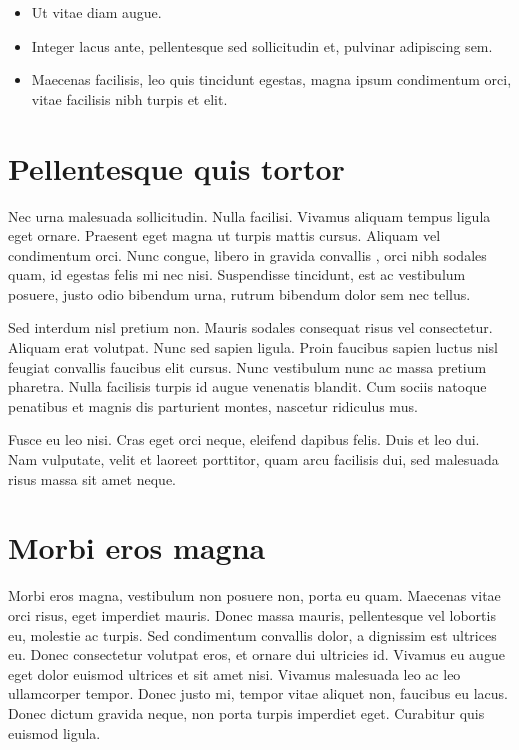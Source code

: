 \documentclass[a4paper,USenglish,english]{lipics-v2018}
\begin{document}
\begin{itemize}
\item Ut vitae diam augue. 
\item Integer lacus ante, pellentesque sed sollicitudin et, pulvinar adipiscing sem. 
\item Maecenas facilisis, leo quis tincidunt egestas, magna ipsum condimentum orci, vitae facilisis nibh turpis et elit. 
\end{itemize}

\section{Pellentesque quis tortor}

Nec urna malesuada sollicitudin. Nulla facilisi. Vivamus aliquam tempus ligula eget ornare. Praesent eget magna ut turpis mattis cursus. Aliquam vel condimentum orci. Nunc congue, libero in gravida convallis \cite{DBLP:conf/focs/HopcroftPV75}, orci nibh sodales quam, id egestas felis mi nec nisi. Suspendisse tincidunt, est ac vestibulum posuere, justo odio bibendum urna, rutrum bibendum dolor sem nec tellus. 

\begin{lemma} 
Sed interdum nisl pretium non. Mauris sodales consequat risus vel consectetur. Aliquam erat volutpat. Nunc sed sapien ligula. Proin faucibus sapien luctus nisl feugiat convallis faucibus elit cursus. Nunc vestibulum nunc ac massa pretium pharetra. Nulla facilisis turpis id augue venenatis blandit. Cum sociis natoque penatibus et magnis dis parturient montes, nascetur ridiculus mus.
\end{lemma}

Fusce eu leo nisi. Cras eget orci neque, eleifend dapibus felis. Duis et leo dui. Nam vulputate, velit et laoreet porttitor, quam arcu facilisis dui, sed malesuada risus massa sit amet neque.

\appendix
\section{Morbi eros magna}

Morbi eros magna, vestibulum non posuere non, porta eu quam. Maecenas vitae orci risus, eget imperdiet mauris. Donec massa mauris, pellentesque vel lobortis eu, molestie ac turpis. Sed condimentum convallis dolor, a dignissim est ultrices eu. Donec consectetur volutpat eros, et ornare dui ultricies id. Vivamus eu augue eget dolor euismod ultrices et sit amet nisi. Vivamus malesuada leo ac leo ullamcorper tempor. Donec justo mi, tempor vitae aliquet non, faucibus eu lacus. Donec dictum gravida neque, non porta turpis imperdiet eget. Curabitur quis euismod ligula. 





\end{document}
